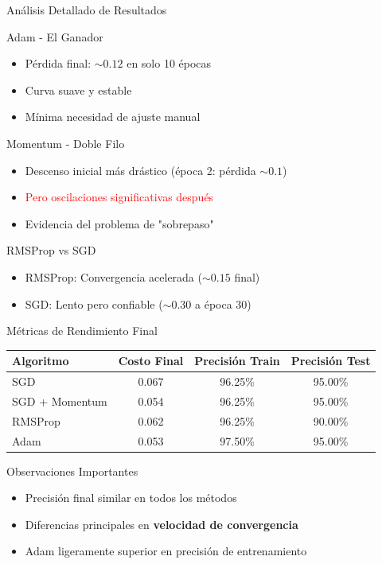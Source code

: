 \documentclass[10pt]{beamer}
\begin{document}
\begin{frame}{Análisis Detallado de Resultados}
\begin{block}{Adam - El Ganador}
\begin{itemize}
\item Pérdida final: $\sim 0.12$ en solo 10 épocas
\item Curva suave y estable
\item Mínima necesidad de ajuste manual
\end{itemize}
\end{block}

\begin{block}{Momentum - Doble Filo}
\begin{itemize}
\item Descenso inicial más drástico (época 2: pérdida $\sim 0.1$)
\item \textcolor{red}{Pero oscilaciones significativas después}
\item Evidencia del problema de "sobrepaso"
\end{itemize}
\end{block}

\begin{block}{RMSProp vs SGD}
\begin{itemize}
\item RMSProp: Convergencia acelerada ($\sim 0.15$ final)
\item SGD: Lento pero confiable ($\sim 0.30$ a época 30)
\end{itemize}
\end{block}
\end{frame}

\begin{frame}{Métricas de Rendimiento Final}
\begin{table}[ht]
\centering
\small
\begin{tabular}{lccc}
\toprule
\textbf{Algoritmo} & \textbf{Costo Final} & \textbf{Precisión Train} & \textbf{Precisión Test} \\
\midrule
SGD & 0.067 & 96.25\% & 95.00\% \\
SGD + Momentum & 0.054 & 96.25\% & 95.00\% \\
RMSProp & 0.062 & 96.25\% & 90.00\% \\
Adam & 0.053 & 97.50\% & 95.00\% \\
\bottomrule
\end{tabular}
\end{table}

\begin{block}{Observaciones Importantes}
\begin{itemize}
\item Precisión final similar en todos los métodos
\item Diferencias principales en \textbf{velocidad de convergencia}
\item Adam ligeramente superior en precisión de entrenamiento
\end{itemize}
\end{block}
\end{frame}
\end{document}
